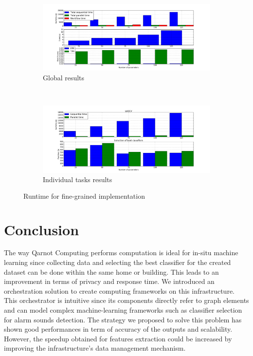 \documentclass[10pt, conference, compsocconf]{IEEEtran}
\begin{document}
\begin{figure}[h]
  \begin{center}
    \begin{subfigure}{0.5\textwidth}
      \captionsetup{skip=0pt}
      \centering
      \includegraphics[width=\textwidth]{Figures/times_increasparams_global_bars.png}
      \caption{\footnotesize Global results \label{subfig:scalability_glob}}
  \end{subfigure} \\
  \begin{subfigure}{0.5\textwidth}
    \captionsetup{skip=0pt}
    \centering
    \includegraphics[width=\textwidth]{Figures/times_increasparams_individual_bars.png}
    \caption{\footnotesize Individual tasks results \label{subfig:scalability_ind}}
  \end{subfigure}
\end{center}
\caption{Runtime for fine-grained implementation \label{fig:scalability}}
\end{figure}
\section{Conclusion} \label{Conclusion}
The way Qarnot Computing performs computation is ideal for in-situ machine learning since collecting data and selecting the best classifier for the created dataset can be done within the same home or building. This leads to an improvement in terms of privacy and response time. We introduced an orchestration solution to create computing frameworks on this infrastructure. This orchestrator is intuitive since its components directly refer to graph elements and can model complex machine-learning frameworks such as classifier selection for alarm sounds detection. The strategy we proposed to solve this problem has shown good performances in term of accuracy of the outputs and scalability. However, the speedup obtained for features extraction could be increased by improving the infrastructure's data management mechanism.

\def\IEEEbibitemsep{.1pt}






\end{document}
